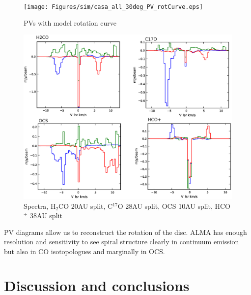\documentclass[useAMS,usenatbib]{mn2e}
\begin{document}
\begin{figure}
 \texttt{[image: Figures/sim/casa\_all\_30deg\_PV\_rotCurve.eps]}

 \caption{PVs with model rotation curve}
\end{figure}


\begin{figure}
 \includegraphics[width=168mm]{Figures/sim/casa_all_spectra.eps}

 \caption{Spectra, H$_2$CO 20AU split, C$^{17}$O 28AU split, OCS 10AU split, HCO$^+$ 38AU split}
\end{figure}

%

PV diagrams allow us to reconstruct the rotation of the disc. ALMA has enough resolution and sensitivity to see spiral structure clearly in continuum emission but also in CO isotopologues and marginally in OCS.


\section{Discussion and conclusions} \label{sec:discussion}
\end{document}
